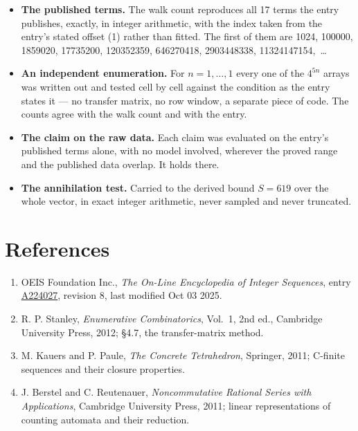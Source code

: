 \documentclass[11pt]{article}
\theoremstyle{definition}
\begin{document}
\begin{itemize}

\item {\bfseries The published terms.} The walk count reproduces all 17 terms the entry publishes, exactly, in integer arithmetic, with the index taken from the entry's stated offset (1) rather than fitted. The first of them are 1024, 100000, 1859020, 17735200, 120352359, 646270418, 2903448338, 11324147154,~\dots

\item {\bfseries An independent enumeration.} For $n = 1,\dots,1$ every one of the $4^{5n}$ arrays was written out and tested cell by cell against the condition as the entry states it --- no transfer matrix, no row window, a separate piece of code. The counts agree with the walk count and with the entry.

\item {\bfseries The claim on the raw data.} Each claim was evaluated on the entry's published terms alone, with no model involved, wherever the proved range and the published data overlap. It holds there.

\item {\bfseries The annihilation test.} Carried to the derived bound $S = 619$ over the whole vector, in exact integer arithmetic, never sampled and never truncated.

\end{itemize}

\section{References}

\begin{enumerate}

\item OEIS Foundation Inc., \emph{The On-Line Encyclopedia of Integer Sequences}, entry \href{https://oeis.org/A224027}{A224027}, revision 8, last modified Oct 03 2025.

\item R. P. Stanley, \emph{Enumerative Combinatorics}, Vol.~1, 2nd ed., Cambridge University Press, 2012; \S4.7, the transfer-matrix method.

\item M. Kauers and P. Paule, \emph{The Concrete Tetrahedron}, Springer, 2011; C-finite sequences and their closure properties.

\item J. Berstel and C. Reutenauer, \emph{Noncommutative Rational Series with Applications}, Cambridge University Press, 2011; linear representations of counting automata and their reduction.

\end{enumerate}
\end{document}

